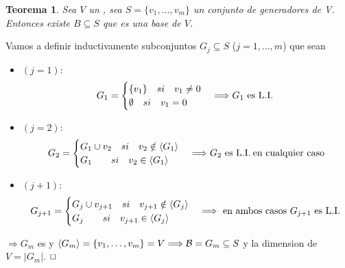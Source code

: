 \documentclass[]{article}
\newtheorem{theorem}{Teorema}
\newenvironment{proof}{\noindent{\bf Prueba:}}{$\hfill \Box$ \vspace{10pt}}
\newcommand{\ida}{\Longrightarrow}
\newcommand{\base}{\text{$\mathcal{B}$}}
\begin{document}
\begin{theorem}
    Sea $V$ un \espvec, sea $S=\{ v_1, \dots ,v_m \}$ un conjunto de generadores de V. Entonces existe
    $B \subseteq S$ que es una base de $V$. 
\end{theorem}
\begin{proof}
    Vamos a definir inductivamente subconjuntos $G_j \subseteq S$ ($j=1,\dots,m$) que sean \li
    \begin{itemize}
        \item $(j=1):$
        \begin{align*}
            G_1=
            \begin{cases}
                \{v_1\} \quad si \quad v_1 \neq 0\\
                \emptyset \quad si \quad v_1 = 0
            \end{cases}
            \ida G_1 \text{ es \li}
        \end{align*}
        \item $(j=2):$
        \begin{align*}
            G_2=
            \begin{cases}
                G_1 \cup {v_2} \quad si \quad v_2 \notin \espgen{G_1}\\
                G_1 \quad\quad si \quad v_2 \in \espgen{G_1}
            \end{cases}
            \ida G_2 \text{ es \li en cualquier caso}
        \end{align*}
        \item $(j+1):$
        \begin{align*}
            G_{j+1}=
            \begin{cases}
                G_j \cup {v_{j+1}} \quad si \quad v_{j+1} \notin \espgen{G_j}\\
                G_j \quad\quad si \quad v_{j+1} \in \espgen{G_j}
            \end{cases}
            \ida \text{ en ambos casos $G_{j+1}$ es \li}
        \end{align*}
    \end{itemize}
    $\ida G_m$ es \li y $\espgen{G_m} = \{ v_1,\dots,v_m \} = V \ida \base = G_m \subseteq S$ y la dimension
    de $V = |G_m|$.
\end{proof}
\end{document}
